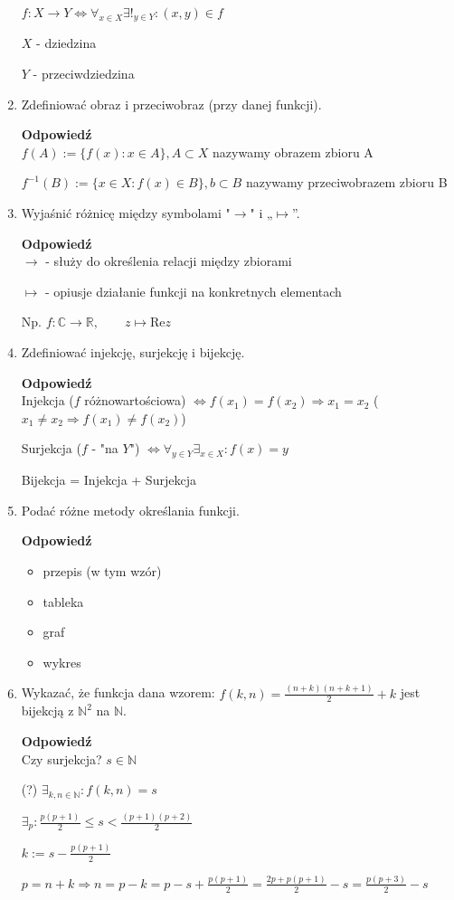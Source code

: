 \documentclass[12pt,a4paper]{article}
\theoremstyle{break}
\newcommand{\Odp}[1]{
		\begin{mdframed}[style=zadanie]
			\textbf{Odpowiedź}\\
			#1
		\end{mdframed}
	}
\begin{document}
\begin{enumerate}[1.]
{		$f:X\rightarrow Y \Leftrightarrow \forall_{x\in X} \exists!_{y\in Y}: (x,y)\in f$
		
		$X$ - dziedzina
		
		$Y$ - przeciwdziedzina
	}
	
	\item Zdefiniować obraz i przeciwobraz (przy danej funkcji).
	\Odp{
		$f(A):= \{f(x):x\in A\}, A\subset X$ nazywamy obrazem zbioru A
		
		$f^{-1}(B):= \{x\in X: f(x)\in B\}, b\subset B$ nazywamy przeciwobrazem zbioru B 
	}
	
	\item Wyjaśnić różnicę między symbolami "$\longrightarrow$" i „$\longmapsto$”.
	\Odp{
		$\longrightarrow$ - służy do określenia relacji między zbiorami
		
		$\longmapsto$ - opiusje działanie funkcji na konkretnych elementach
		
		Np. $f:\mathbb{C} \longrightarrow \mathbb{R}, \qquad z\longmapsto \text{Re}z$
	}
	\newpage
	\item Zdefiniować injekcję, surjekcję i bijekcję.
	\Odp{
		Injekcja ($f$ różnowartościowa) $\Leftrightarrow f(x_1)=f(x_2)\Rightarrow x_1=x_2$ ($x_1\neq x_2 \Rightarrow f(x_1)\neq f(x_2)$)
		
		Surjekcja ($f$ - "na $Y$") $\Leftrightarrow \forall_{y\in Y} \exists_{x\in X} : f(x)=y$
		
		Bijekcja = Injekcja + Surjekcja
	}
	
	\item Podać różne metody określania funkcji.
	\Odp{
		\begin{itemize}
			\item przepis (w tym wzór)
			\item tableka
			\item graf
			\item wykres
		\end{itemize}
	}
	
	\item Wykazać, że funkcja dana wzorem: $f (k, n) = \frac{(n+k)(n+k+1)}{2}+k$ jest bijekcją z $\mathbb{N}^2$ na $\mathbb{N}$.
	\Odp{
		Czy surjekcja? $s\in \mathbb{N}$
		
		(?) $\exists_{k,n\in\mathbb{N}}: f(k,n)=s$
		
		$\exists_p: \frac{p(p+1)}{2}\leq s < \frac{(p+1)(p+2)}{2}$
		
		$k:=s-\frac{p(p+1)}{2}$ 
		
		$p=n+k\Rightarrow n=p-k = p-s+\frac{p(p+1)}{2}=\frac{2p+p(p+1)}{2}-s=\frac{p(p+3)}{2}-s$
		
}
\end{enumerate}
\end{document}
